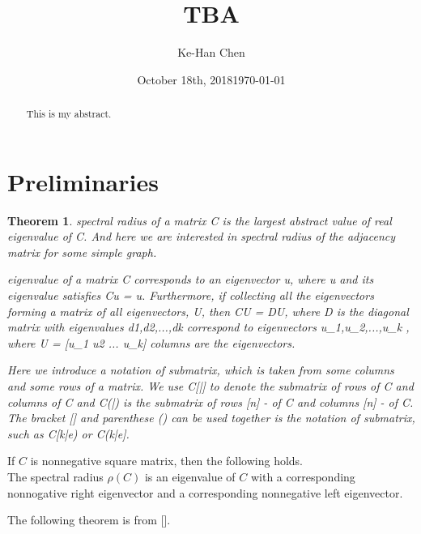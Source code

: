 \documentclass{article}
\theoremstyle{plain}
\newtheorem{thm}{Theorem}[section]
\theoremstyle{definition}
\begin{document}
\title{TBA}
\author{Ke-Han Chen\\} %
\date{October 18th, 2018}
\date{\today} %

\maketitle
\begin{abstract}
    This is my abstract.
\end{abstract}

\section{Preliminaries}

\begin{thm}
spectral radius of a matrix C is the largest abstract value of real eigenvalue of C. And here we are interested in spectral radius of the adjacency matrix for some simple graph.

    eigenvalue of a matrix C corresponds to an eigenvector u, where u and its eigenvalue \lambda satisfies Cu = \lambda u. Furthermore, if collecting all the eigenvectors forming a matrix of all eigenvectors, U, then CU = DU, where D is the diagonal matrix with eigenvalues d1,d2,...,dk correspond to eigenvectors u_1,u_2,...,u_k , where U = [u_1 u2 ... u_k] columns are the eigenvectors.

    Here we introduce a notation of submatrix, which is taken from some columns and some rows of a matrix. We use C[\alpha|\beta] to denote the submatrix of rows \alpha of C and columns \beta of C and C(\alpha|\beta) is the submatrix of rows [n] - \alpha of C and columns [n] - \beta of C.
    The bracket [] and parenthese () can be used together is the notation of submatrix, such as C[k|e) or C(k|e]. 
\end{thm}

\thm
        If $C$ is nonnegative square matrix, then the following holds. \\
        The spectral radius $\rho(C)$ is an eigenvalue of $C$ with a corresponding nonnogative right eigenvector and a corresponding nonnegative left eigenvector.

The following theorem is from [].
\end{document}
